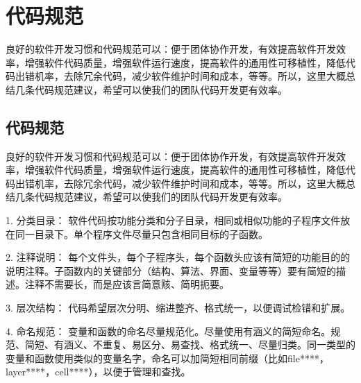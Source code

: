 
\resetdatestamp %

\chapter{代码规范} \label{ChCodeRule}

\pagestyle{fancy} \fancyhead[RO,RE]{}
\fancyhead[LE]{\MakeUppercase{\leftmark}}
\fancyhead[LO]{\MakeUppercase{\rightmark}}
\fancyfoot[C]{\thepage} %

良好的软件开发习惯和代码规范可以：便于团体协作开发，有效提高软件开发效率，增强软件代码质量，增强软件运行速度，提高软件的通用性可移植性，降低代码出错机率，去除冗余代码，减少软件维护时间和成本，等等。所以，这里大概总结几条代码规范建议，希望可以使我们的团队代码开发更有效率。

\section{代码规范} \label{SectCodeRuleDeng}
良好的软件开发习惯和代码规范可以：便于团体协作开发，有效提高软件开发效率，增强软件代码质量，增强软件运行速度，提高软件的通用性可移植性，降低代码出错机率，去除冗余代码，减少软件维护时间和成本，等等。所以，这里大概总结几条代码规范建议，希望可以使我们的团队代码开发更有效率。

1.	分类目录：
软件代码按功能分类和分子目录，相同或相似功能的子程序文件放在同一目录下。单个程序文件尽量只包含相同目标的子函数。

2.	注释说明：
每个文件头，每个子程序头，每个函数头应该有简短的功能目的的说明注释。子函数内的关键部分（结构、算法、界面、变量等等）要有简短的描述。注释不需要长，而是应该言简意赅、简明扼要。

3.	层次结构：
代码希望层次分明、缩进整齐、格式统一，以便调试检错和扩展。

4.	命名规范：
变量和函数的命名尽量规范化。尽量使用有涵义的简短命名。规范、简短、有涵义、不重复、易区分、易查找、格式统一、尽量归类。同一类型的变量和函数使用类似的变量名字，命名可以加简短相同前缀（比如file****，layer****，cell****），以便于管理和查找。

